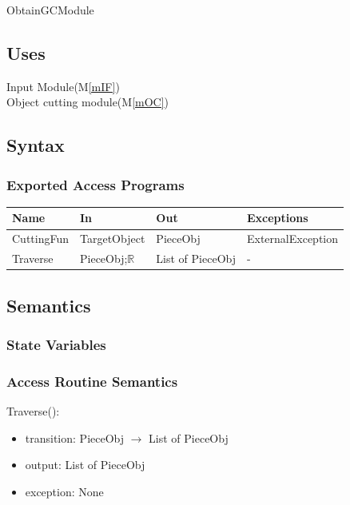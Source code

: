 \documentclass[12pt, titlepage]{article}
\newcommand{\mref}[1]{M\ref{#1}}
\begin{document}
ObtainGCModule

\subsection{Uses}

Input Module(\mref{mIF})\\
Object cutting module(\mref{mOC})\\

\subsection{Syntax}

\subsubsection{Exported Access Programs}

\begin{center}
	\begin{tabular}{p{2cm} p{4cm} p{4cm} p{2cm}}
		\hline
		\textbf{Name} & \textbf{In} & \textbf{Out} & \textbf{Exceptions} \\
		\hline
		CuttingFun & TargetObject & PieceObj & ExternalException \\
		Traverse & PieceObj;$\mathbb{R}$ & List of PieceObj & -\\
		\hline
		
	\end{tabular}
\end{center}

\subsection{Semantics}

\subsubsection{State Variables}
\subsubsection{Access Routine Semantics}


\noindent Traverse():
\begin{itemize}
	\item transition: PieceObj $\rightarrow$ List of PieceObj 
	\item output: List of PieceObj 
	\item exception: None
\end{itemize}
\end{document}
